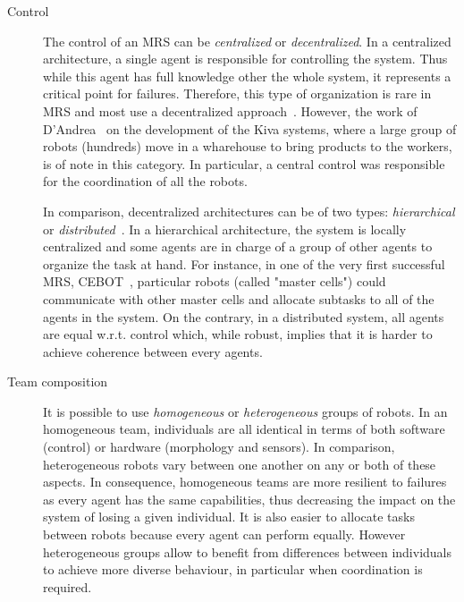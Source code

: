     \begin{description}
      \item[Control] {The control of an MRS can be \emph{centralized} or \emph{decentralized}. In a centralized architecture, a single agent is responsible for controlling the system. Thus while this agent has full knowledge other the whole system, it represents a critical point for failures. Therefore, this type of organization is rare in MRS and most use a decentralized approach~\parencite{Parker2008}. However, the work of D'Andrea~\parencite{DAndrea2012} on the development of the Kiva systems, where a large group of robots (hundreds) move in a wharehouse to bring products to the workers, is of note in this category. In particular, a central control was responsible for the coordination of all the robots. 

      In comparison, decentralized architectures can be of two types: \emph{hierarchical} or \emph{distributed}~\parencite{Cao1997}. In a hierarchical architecture, the system is locally centralized and some agents are in charge of a group of other agents to organize the task at hand. For instance, in one of the very first successful MRS, CEBOT~\parencite{Fukuda1988}, particular robots (called "master cells") could communicate with other master cells and allocate subtasks to all of the agents in the system. On the contrary, in a distributed system, all agents are equal w.r.t. control which, while robust, implies that it is harder to achieve coherence between every agents.}

      \item[Team composition] {It is possible to use \emph{homogeneous} or \emph{heterogeneous} groups of robots. In an homogeneous team, individuals are all identical in terms of both software (control) or hardware (morphology and sensors). In comparison, heterogeneous robots vary between one another on any or both of these aspects. In consequence, homogeneous teams are more resilient to failures as every agent has the same capabilities, thus decreasing the impact on the system of losing a given individual. It is also easier to allocate tasks between robots because every agent can perform equally. However heterogeneous groups allow to benefit from differences between individuals to achieve more diverse behaviour, in particular when coordination is required.}


\end{description}
